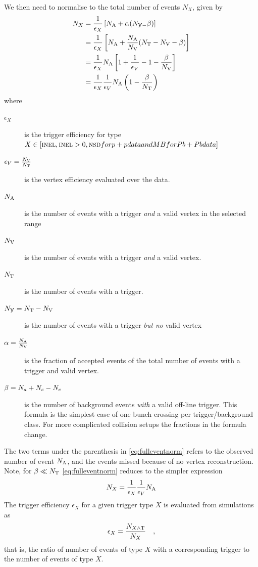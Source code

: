 \documentclass[11pt]{article}
\def\AlwaysText#1{\ifmmode\relax\text{#1}\else #1\fi}
\newcommand{\AbbrName}[1]{\AlwaysText{{\scshape #1}}}
\newcommand{\INEL}{\AbbrName{inel}}
\newcommand{\INELONE}{$\AbbrName{inel}>0$}
\newcommand{\NSD}{\AbbrName{nsd}}
\newcommand{\N}[2]{{\ensuremath N_{#1#2}}}
\newcommand{\NV}[1][]{\N{\text{V}}{#1}}
\newcommand{\NnotV}{\N{\not{\text{V}}}}
\newcommand{\NT}{\N{\text{T}}{}}
\newcommand{\NA}{\N{\text{A}}{}}
\begin{document}
We then need to normalise to the total number of events $N_X$, given
by 
\begin{align}
  \N{X}{} &= \frac{1}{\epsilon_X}\left[\NA + \alpha(\NnotV -
    \beta)\right]  \label{eq:fulleventnorm}\\
  & = \frac{1}{\epsilon_X}\left[\NA + \frac{\NA}{\NV}(\NT-\NV{} -
    \beta)\right]\nonumber \\
  & =\frac{1}{\epsilon_X}\NA\left[1+\frac{1}{\epsilon_V}-1-
    \frac{\beta}{\NV}\right]\nonumber\\ 
  & = \frac{1}{\epsilon_X}\frac{1}{\epsilon_V}\NA
  \left(1-\frac{\beta}{\NT{}}\right)\nonumber
\end{align}
where
\begin{description}
\item[$\epsilon_X$]  is the trigger efficiency for type
  $X\in[\text{\INEL},\text{\INELONE},\text{\NSD} for p+p data and MB
  for Pb+Pb data]$
\item[$\epsilon_V=\frac{\NV{}}{\NT{}}$] is the vertex efficiency
  evaluated over the data.
\item[$\NA$] is the number of events with a trigger \emph{and} a valid
  vertex in the selected range
\item[$\NV{}$] is the number of events with a trigger \emph{and} a valid
  vertex. 
\item[$\NT$] is the number of events with a trigger.
\item[$\NnotV{}=\NT-\NV{}$] is the number of events with a trigger
  \emph{but no} valid vertex
\item[$\alpha=\frac{\NA}{\NV}$] is the fraction of accepted events of
  the total number of events with a trigger and valid vertex.  
\item[$\beta=\N{a}{}+\N{c}{}-\N{e}{}$] is the number of background
  events \emph{with} a valid off-line trigger. This formula is the
  simplest case of one bunch crossing per trigger/background
  class. For more complicated collision setups the fractions in the
  formula change.
\end{description}
The two terms under the parenthesis in \eqref{eq:fulleventnorm} refers
to the observed number of event $\NA$, and the events missed because
of no vertex reconstruction.  Note, for $\beta\ll\NT{}$
\eqref{eq:fulleventnorm} reduces to the simpler expression
$$
\N{X}{} = \frac1{\epsilon_X}\frac1{\epsilon_V}\NA{}
$$
The trigger efficiency $\epsilon_X$ for a given trigger type $X$ is
evaluated from simulations as
\begin{align}
  \epsilon_X = \frac{\N{X\wedge \text{T}}{}}{\N{X}{}}\quad,
\end{align}
that is, the ratio of number of events of type $X$ with a
corresponding trigger to the number of events of type $X$. 
\end{document}

